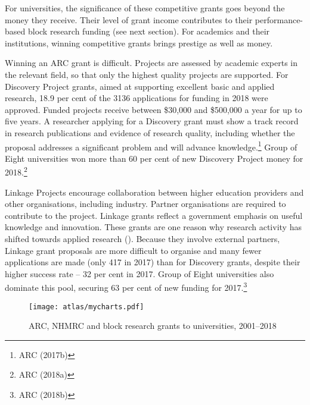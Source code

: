 \documentclass{grattan}
\begin{document}
For universities, the significance of these competitive grants goes beyond the money they receive. Their level of grant income contributes to their performance-based block research funding (see next section). For academics and their institutions, winning competitive grants brings prestige as well as money.

Winning an ARC grant is difficult. Projects are assessed by academic experts in the relevant field, so that only the highest quality projects are supported. For Discovery Project grants, aimed at supporting excellent basic and applied research, 18.9 per cent of the 3136 applications for funding in 2018 were approved. Funded projects receive between \$30,000 and \$500,000 a year for up to five years. A researcher applying for a Discovery grant must show a track record in research publications and evidence of research quality, including whether the proposal addresses a significant problem and will advance knowledge.\footnote{ARC (2017b)} Group of Eight universities won more than 60 per cent of new Discovery Project money for 2018.\footnote{ARC (2018a)}

Linkage Projects encourage collaboration between higher education providers and other organisations, including industry. Partner organisations are required to contribute to the project. Linkage grants reflect a government emphasis on useful knowledge and innovation. These grants are one reason why research activity has shifted towards applied research (). Because they involve external partners, Linkage grant proposals are more difficult to organise and many fewer applications are made (only 417 in 2017) than for Discovery grants, despite their higher success rate -- 32 per cent in 2017. Group of Eight universities also dominate this pool, securing 63 per cent of new funding for 2017.\footnote{ARC (2018b)}


    \begin{figure} %
    \caption{ARC, NHMRC and block research grants to universities, 2001--2018}\label{fig:arc-nhmrc-and-block-research-grants-to-universities-20012018}
    \texttt{[image: atlas/mycharts.pdf]}
    \end{figure}
\end{document}
